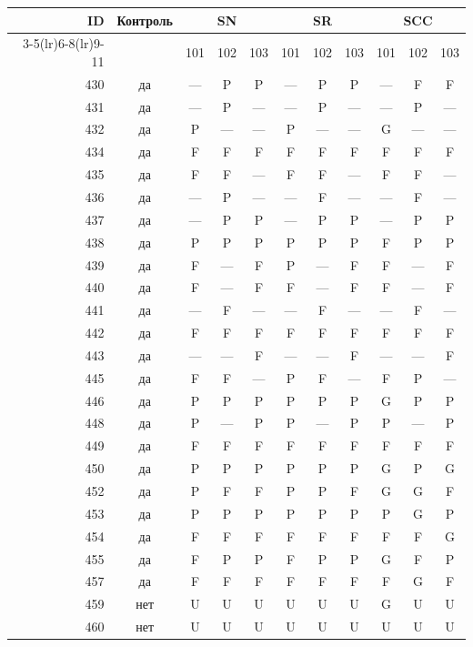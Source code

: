 \begin{table}[p]\centering\small
\begin{tabular*}{\textwidth}{@{\extracolsep{\fill}}rc*{9}{c}@{}}\toprule
ID & Контроль & \multicolumn{3}{c}{SN} & \multicolumn{3}{c}{SR} & \multicolumn{3}{c}{SCC}\\
\cmidrule(lr){3-5}\cmidrule(lr){6-8}\cmidrule(lr){9-11}
 & & 101 & 102 & 103 & 101 & 102 & 103 & 101 & 102 & 103\\\midrule
430 & да & — & P & P & — & P & P & — & F & F\\
431 & да & — & P & — & — & P & — & — & P & —\\
432 & да & P & — & — & P & — & — & G & — & —\\
434 & да & F & F & F & F & F & F & F & F & F\\
435 & да & F & F & — & F & F & — & F & F & —\\
436 & да & — & P & — & — & F & — & — & F & —\\
437 & да & — & P & P & — & P & P & — & P & P\\
438 & да & P & P & P & P & P & P & F & P & P\\
439 & да & F & — & F & P & — & F & F & — & F\\
440 & да & F & — & F & F & — & F & F & — & F\\
441 & да & — & F & — & — & F & — & — & F & —\\
442 & да & F & F & F & F & F & F & F & F & F\\
443 & да & — & — & F & — & — & F & — & — & F\\
445 & да & F & F & — & P & F & — & F & P & —\\
446 & да & P & P & P & P & P & P & G & P & P\\
448 & да & P & — & P & P & — & P & P & — & P\\
449 & да & F & F & F & F & F & F & F & F & F\\
450 & да & P & P & P & P & P & P & G & P & G\\
452 & да & P & F & F & P & P & F & G & G & F\\
453 & да & P & P & P & P & P & P & P & G & P\\
454 & да & F & F & F & F & F & F & F & F & G\\
455 & да & F & P & P & F & P & P & G & F & P\\
457 & да & F & F & F & F & F & F & F & G & F\\
459 & нет & U & U & U & U & U & U & G & U & U\\
460 & нет & U & U & U & U & U & U & U & U & U\\

\end{tabular*}
\end{table}
